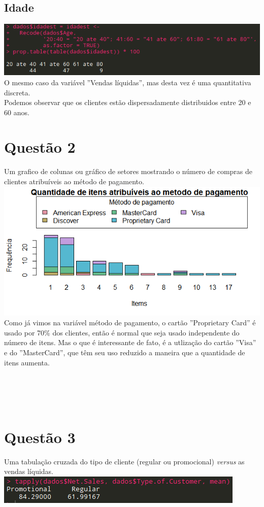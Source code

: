 \documentclass[a4paper,12pt]{article}
\begin{document}
\subsection{Idade}
\includegraphics[]{idade.png}\\

O mesmo caso da variável ''Vendas líquidas'', mas desta vez é uma quantitativa discreta.\\

Podemos observar que os clientes estão dispersadamente distribuidos entre 20 e 60 anos.

\section{Questão 2}
Um grafico de colunas ou gráfico de setores mostrando o número de compras de clientes atribuíveis ao método de pagamento.\\
\includegraphics[]{ave.png}\\

Como já vimos na variável método de pagamento, o cartão ''Proprietary Card'' é usado por 70\% dos clientes, então é normal que seja usado independente do número de itens. Mas o que é interessante de fato, é a utlização do cartão ''Visa'' e do ''MasterCard'', que têm seu uso reduzido a maneira que a quantidade de itens aumenta.\\
\\
\\
\\
\\

\section{Questão 3}
Uma tabulação cruzada do tipo de cliente (regular ou promocional) \textit{versus} as vendas líquidas.\\
\includegraphics[]{tapply.png}\\
\end{document}
